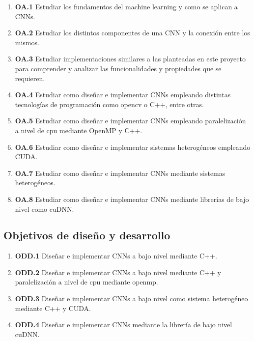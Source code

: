 \begin{enumerate}
	\item \textbf{OA.1} Estudiar los fundamentos del machine learning y como se aplican a CNNs.
	
	\item \textbf{OA.2} Estudiar los distintos componentes de una CNN y la conexión entre los mismos.
	
	\item \textbf{OA.3} Estudiar implementaciones similares a las planteadas en este proyecto para comprender y analizar las funcionalidades y propiedades que se requieren. 
	
	\item \textbf{OA.4} Estudiar como diseñar e implementar CNNs empleando distintas tecnologías de programación como opencv o C++, entre otras.
	
	\item \textbf{OA.5} Estudiar como diseñar e implementar CNNs empleando paralelización a nivel de cpu mediante OpenMP y C++.
	
	\item \textbf{OA.6} Estudiar como diseñar e implementar sistemas heterogéneos empleando CUDA.

	\item \textbf{OA.7} Estudiar como diseñar e implementar CNNs mediante sistemas heterogéneos.

	\item \textbf{OA.8} Estudiar como diseñar e implementar CNNs mediante librerías de bajo nivel como cuDNN.

\end{enumerate}

\subsection{Objetivos de diseño y desarrollo}

\begin{enumerate}
	\item \textbf{ODD.1} Diseñar e implementar CNNs a bajo nivel mediante C++.
	
	\item \textbf{ODD.2} Diseñar e implementar CNNs a bajo nivel mediante C++ y paralelización a nivel de cpu mediante openmp.

	\item \textbf{ODD.3} Diseñar e implementar CNNs a bajo nivel como sistema heterogéneo mediante C++ y CUDA.

	\item \textbf{ODD.4} Diseñar e implementar CNNs mediante la librería de bajo nivel cuDNN.		
	
\end{enumerate}
